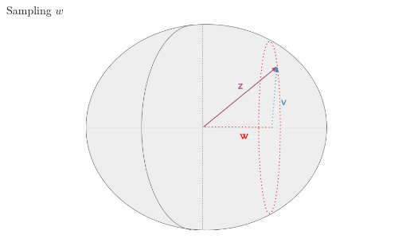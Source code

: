 \begin{frame}{Sampling $w$}
  \centering
  \includegraphics[width=\textwidth]{figures/illustration_sampling_4.png}
\end{frame}